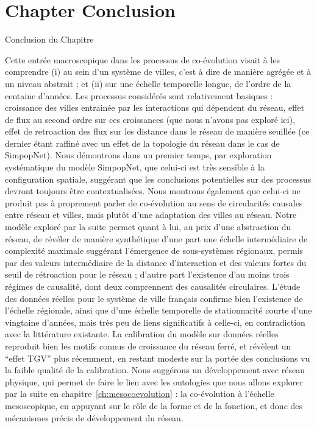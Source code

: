 

\newpage


\section*{Chapter Conclusion}{Conclusion du Chapitre}


Cette entrée macroscopique dans les processus de co-évolution visait à les comprendre (i) au sein d'un système de villes, c'est à dire de manière agrégée et à un niveau abstrait ; et (ii) sur une échelle temporelle longue, de l'ordre de la centaine d'années. Les processus considérés sont relativement basiques : croissance des villes entrainée par les interactions qui dépendent du réseau, effet de flux au second ordre sur ces croissances (que nous n'avons pas exploré ici), effet de retroaction des flux sur les distance dans le réseau de manière seuillée (ce dernier étant raffiné avec un effet de la topologie du réseau dans le cas de SimpopNet). Nous démontrons dans un premier temps, par exploration systématique du modèle SimpopNet, que celui-ci est très sensible à la configuration spatiale, suggérant que les conclusions potentielles sur des processus devront toujours être contextualisées. Nous montrons également que celui-ci ne produit pas à proprement parler de co-évolution au sens de circularités causales entre réseau et villes, mais plutôt d'une adaptation des villes au réseau. Notre modèle exploré par la suite permet quant à lui, au prix d'une abstraction du réseau, de révéler de manière synthétique d'une part une échelle intermédiaire de complexité maximale suggérant l'émergence de sous-systèmes régionaux, permis par des valeurs intermédiaire de la distance d'interaction et des valeurs fortes du seuil de rétroaction pour le réseau ; d'autre part l'existence d'au moins trois régimes de causalité, dont deux comprennent des causalités circulaires. L'étude des données réelles pour le système de ville français confirme bien l'existence de l'échelle régionale, ainsi que d'une échelle temporelle de stationnarité courte d'une vingtaine d'années, mais très peu de liens significatifs à celle-ci, en contradiction avec la littérature existante. La calibration du modèle sur données réelles reproduit bien les motifs connus de croissance du réseau ferré, et révèlent un ``effet TGV'' plus récemment, en restant modeste sur la portée des conclusions vu la faible qualité de la calibration. Nous suggérons un développement avec réseau physique, qui permet de faire le lien avec les ontologies que nous allons explorer par la suite en chapitre~\ref{ch:mesocoevolution} : la co-évolution à l'échelle mesoscopique, en appuyant sur le rôle de la forme et de la fonction, et donc des mécanismes précis de développement du réseau.




\stars
